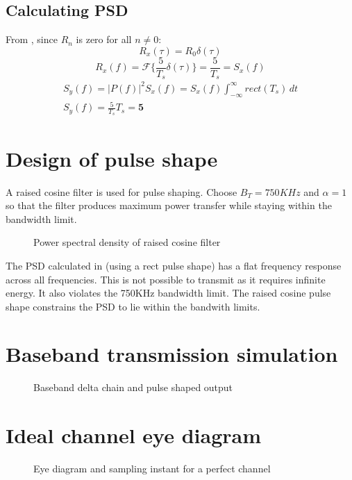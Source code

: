 \documentclass[11pt]{article}
\begin{document}
\subsection{Calculating PSD}
From , since $R_n$ is zero for all $n\neq 0$:
\begin{equation}
    R_x(\tau) = R_0 \delta(\tau)
\end{equation}
\begin{equation}
    R_x(f) = \mathcal{F}\{\frac{5}{T_s} \delta(\tau)\} = \frac{5}{T_s} = S_x(f)
\end{equation}
\begin{equation}
    \begin{gathered}
        S_y(f) = |P(f)|^2S_x(f) = S_x(f) \int_{-\infty}^{\infty} rect(T_s)
        \,dt\\
        S_y(f) = \frac{5}{T_s}T_s = \boldsymbol 5
    \end{gathered}
\end{equation}


\section{Design of pulse shape}
A raised cosine filter is used for pulse shaping. Choose $B_T = 750KHz$ and
$\alpha = 1$ so that the filter produces maximum power transfer while staying
within the bandwidth limit.
\begin{figure}[H]
    \centering
    \scalebox{0.7}{}
    \caption{Power spectral density of raised cosine filter\label{psdgraph}}
\end{figure}
The PSD calculated in  (using a rect pulse shape) has a
flat frequency response across all frequencies. This is not possible to transmit
as it requires infinite energy. It also violates the 750KHz bandwidth limit. The
raised cosine pulse shape constrains the PSD to lie within the bandwith limits.

\section{Baseband transmission simulation}
\begin{figure}[H]
    \centering
    \scalebox{0.7}{}
    \caption{Baseband delta chain and pulse shaped output\label{bbtxgraph}}
\end{figure}

\section{Ideal channel eye diagram}
\begin{figure}[H]
    \centering
    \scalebox{0.7}{}
    \caption{Eye diagram and sampling instant for a perfect channel}
\end{figure}
\end{document}
